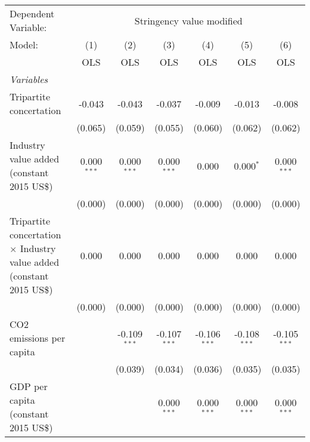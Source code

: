 
\begingroup
\centering
\begin{tabular}{lcccccc}
   \toprule
   Dependent Variable: & \multicolumn{6}{c}{Stringency value modified}\\
   Model:                                                                       & (1)           & (2)            & (3)            & (4)            & (5)            & (6)\\  
                                                                                &  OLS          & OLS            & OLS            & OLS            & OLS            & OLS\\  
   \midrule
   \emph{Variables}\\
   Tripartite concertation                                                      & -0.043        & -0.043         & -0.037         & -0.009         & -0.013         & -0.008\\   
                                                                                & (0.065)       & (0.059)        & (0.055)        & (0.060)        & (0.062)        & (0.062)\\   
   Industry value added (constant 2015 US\$)                                    & 0.000$^{***}$ & 0.000$^{***}$  & 0.000$^{***}$  & 0.000          & 0.000$^{*}$    & 0.000$^{***}$\\   
                                                                                & (0.000)       & (0.000)        & (0.000)        & (0.000)        & (0.000)        & (0.000)\\   
   Tripartite concertation $\times$ Industry value added (constant 2015 US\$)   & 0.000         & 0.000          & 0.000          & 0.000          & 0.000          & 0.000\\   
                                                                                & (0.000)       & (0.000)        & (0.000)        & (0.000)        & (0.000)        & (0.000)\\   
   CO2 emissions per capita                                                     &               & -0.109$^{***}$ & -0.107$^{***}$ & -0.106$^{***}$ & -0.108$^{***}$ & -0.105$^{***}$\\   
                                                                                &               & (0.039)        & (0.034)        & (0.036)        & (0.035)        & (0.035)\\   
   GDP per capita (constant 2015 US\$)                                          &               &                & 0.000$^{***}$  & 0.000$^{***}$  & 0.000$^{***}$  & 0.000$^{***}$\\   

\end{tabular}
